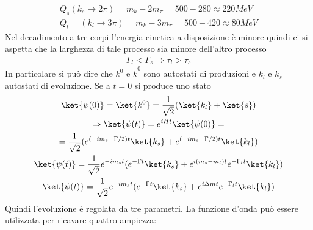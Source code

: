 \documentclass[12pt]{book}
\begin{document}
\begin{gather}
	Q_s (k_s\rightarrow 2\pi ) = m_k - 2m_\pi = 500 -280 \approx 220 MeV\\
	Q_l = (k_l \rightarrow 3 \pi ) = m_k - 3 m_\pi = 500 - 420 \approx 80 MeV 
\end{gather}
Nel decadimento a tre corpi l'energia cinetica a disposizione è minore quindi ci si aspetta che la larghezza di tale processo sia minore dell'altro processo 
\begin{gather}
	\Gamma_l < \Gamma_s \Rightarrow \tau_l > \tau_s
\end{gather}
In particolare si può dire che $k^0$ e $\bar k^0$ sono autostati di produzioni e $k_l$ e $k_s$ autostati di evoluzione. Se a $t=0$ si produce uno stato 
\begin{gather}
	\ket{\psi(0)}=\ket{k^0}	= \frac{1}{\sqrt{2}} ( \ket{k_l} + \ket{s})\\
	\Rightarrow \ket{\psi(t)} = e^{iHt} \ket{\psi(0)}=\\
	=\frac{1}{\sqrt{2}} (e^{(-im_s - \Gamma /2)t} \ket{k_s} + e^{(-im_s - \Gamma /2)t} \ket{k_l})\\
	\ket{\psi(t)}= \frac{1}{\sqrt{2}}e^{-im_st} (e^{-\Gamma t} \ket{k_s} + e^{i(m_s-m_l)t} e^{-\Gamma_l t}\ket{k_l})\\
	\ket{\psi(t)}= \frac{1}{\sqrt{2}}e^{-im_st} (e^{-\Gamma t} \ket{k_s} + e^{i\Delta mt} e^{-\Gamma_l t}\ket{k_l})
\end{gather}
Quindi l'evoluzione è regolata da tre parametri. La funzione d'onda può essere utilizzata per ricavare quattro ampiezza:
\end{document}
